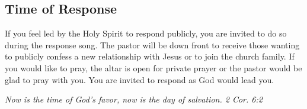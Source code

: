 \vfill

\subsection{Time of Response}
\label{timeofresponse}

If you feel led by the Holy Spirit to respond publicly, you are invited to do so during the response song. The pastor will be down front to receive those wanting to publicly confess a new relationship with Jesus or to join the church family. If you would like to pray, the altar is open for private prayer or the pastor would be glad to pray with you. You are invited to respond as God would lead you.

\small\textit{    Now is the time of God's favor, now is the day of salvation. 2 Cor. 6:2}

\normalsize{}

 \vfill 